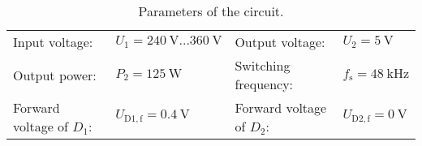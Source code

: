 
\begin{table}[htb]
    \centering  %
    \begin{tabular}{llll}
        \toprule
        Input voltage: &  $U_{\mathrm{1}} = \SI{240}{\volt}...\SI{360}{\volt}$ & Output voltage: & $U_{\mathrm{2}} = \SI{5}{\volt}$ \\ 
        Output power: & $P_{\mathrm{2}} = \SI{125}{\watt}$ & Switching frequency: & $f_{\mathrm{s}} = \SI{48}{\kilo\hertz}$ \\
        Forward voltage of $D_{\mathrm{1}}$: & $U_{\mathrm{D1,f}} = \SI{0.4}{\volt}$ & Forward voltage of $D_{\mathrm{2}}$: & $U_{\mathrm{D2,f}} = \SI{0}{\volt}$  \\
        \bottomrule
    \end{tabular}
    \caption{Parameters of the circuit.}  %
    \label{table:Ex04_Parameters of the singled ended forward converter.}
\end{table}